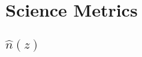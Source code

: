 \documentclass[\docopts]{\docclass}
\begin{document}













\section{Science Metrics}
\label{sec:science}



\subsection{$\hat{n}(z)$}
\label{sec:nz}
\end{document}
